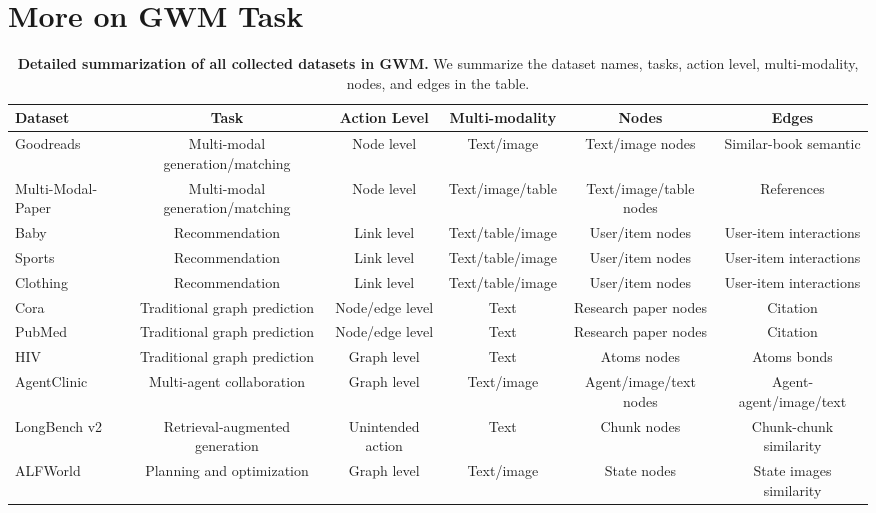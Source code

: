 \section{More on GWM Task} \label{app:dataset}




\begin{table}[t]
\small
 \setlength{\tabcolsep}{7pt}
 \centering
 \renewcommand{\arraystretch}{1}
 \setlength\tabcolsep{1pt}
    \caption{\textbf{Detailed summarization of all collected datasets in GWM.} We summarize the dataset names, tasks, action level, multi-modality, nodes, and edges in the table.}
    \label{tab:dataset_all}
    \centering
    \begin{tabular}{l|ccccc}
        \toprule
        \textbf{Dataset}  & \textbf{Task} & \textbf{Action Level} &  \textbf{Multi-modality} & \textbf{Nodes} & \textbf{Edges}    \\ \midrule
        Goodreads & Multi-modal generation/matching & Node level & Text/image & Text/image nodes &  Similar-book semantic   \\
        Multi-Modal-Paper & Multi-modal generation/matching & Node level & Text/image/table & Text/image/table nodes & References \\
        Baby & Recommendation & Link level & Text/table/image & User/item nodes & User-item interactions  \\
        Sports & Recommendation & Link level & Text/table/image & User/item nodes & User-item interactions  \\
        Clothing & Recommendation & Link level & Text/table/image & User/item nodes & User-item interactions  \\
        Cora & Traditional graph prediction  & Node/edge level & Text & Research paper nodes & Citation  \\
        PubMed & Traditional graph prediction  & Node/edge level & Text & Research paper nodes & Citation  \\
        HIV & Traditional graph prediction & Graph level & Text & Atoms nodes & Atoms bonds \\
        AgentClinic&  Multi-agent collaboration  & Graph level & Text/image & Agent/image/text nodes& Agent-agent/image/text \\
        LongBench v2& Retrieval-augmented generation & Unintended action  & Text & Chunk nodes& Chunk-chunk similarity \\
        ALFWorld& Planning and optimization & Graph level & Text/image & State  nodes &  State images similarity \\ 
        \bottomrule
    \end{tabular}

\end{table}


